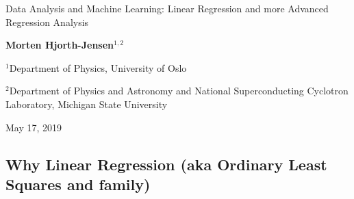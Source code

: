 \documentclass[%
oneside,                 %
final,                   %
10pt]{article}
\begin{document}

\newcommand{\exercisesection}[1]{\subsection*{#1}}






\thispagestyle{empty}

\begin{center}
{\LARGE\bf
\begin{spacing}{1.25}
Data Analysis and Machine Learning: Linear Regression and more Advanced Regression Analysis
\end{spacing}
}
\end{center}


\begin{center}
{\bf Morten Hjorth-Jensen${}^{1, 2}$} \\ [0mm]
\end{center}

\begin{center}
\centerline{{\small ${}^1$Department of Physics, University of Oslo}}
\centerline{{\small ${}^2$Department of Physics and Astronomy and National Superconducting Cyclotron Laboratory, Michigan State University}}
\end{center}
    

\begin{center}
May 17, 2019
\end{center}

\vspace{1cm}


\subsection{Why Linear Regression (aka Ordinary Least Squares and family)}
\end{document}
